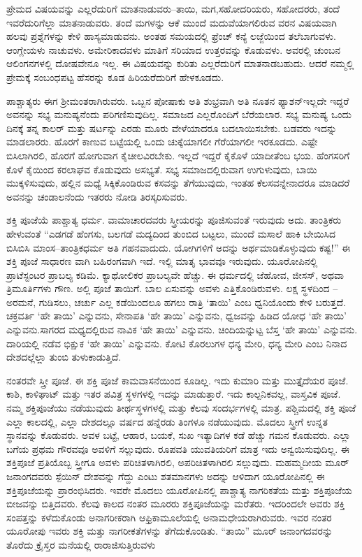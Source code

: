 ಪ್ರೇಮದ ವಿಷಯವನ್ನು ಎಲ್ಲರೆದುರಿಗೆ ಮಾತನಾಡುವರು–ತಾಯಿ, ಮಗ,\break ಸಹೋದರಿಯರು, ಸಹೋದರರು, ತಂದೆ ಇವರೆದುರಿಗೆಲ್ಲಾ ಮಾತನಾಡುವರು. ತಂದೆ ಮಗಳನ್ನು ಆಕೆ ಮುಂದೆ ಮದುವೆಯಾಗಲಿರುವ ವರನ ವಿಷಯವಾಗಿ ಹಲವು ಪ್ರಶ್ನೆಗಳನ್ನು ಕೇಳಿ ಹಾಸ್ಯಮಾಡುವನು. ಅಂತಹ ಸಮಯದಲ್ಲಿ ಫ್ರೆಂಚ್​ ಕನ್ಯೆ ಲಜ್ಜೆಯಿಂದ ತಲೆಬಾಗುವಳು. ಆಂಗ್ಲೇಯಳು ನಾಚುವಳು. ಅಮೇರಿಕಾದವಳು ಮಾತಿಗೆ ಸರಿಯಾದ ಉತ್ತರವನ್ನು ಕೊಡುವಳು. ಅವರಲ್ಲಿ ಚುಂಬನ ಆಲಿಂಗನಗಳಲ್ಲಿ ದೋಷವೇನೂ ಇಲ್ಲ. ಈ ವಿಷಯವನ್ನು ಕುರಿತು ಎಲ್ಲರೆದುರಿಗೆ ಮಾತನಾಡಬಹುದು. ಆದರೆ ನಮ್ಮಲ್ಲಿ ಪ್ರೇಮಕ್ಕೆ ಸಂಬಂಧಪಟ್ಟ ಹೆಸರನ್ನು ಕೂಡ ಹಿರಿಯರೆದುರಿಗೆ ಹೇಳಕೂಡದು.

ಪಾಶ್ಚಾತ್ಯರು ಈಗ ಶ‍್ರೀಮಂತರಾಗಿರುವರು. ಒಬ್ಬನ ಪೋಷಾಕು ಅತಿ ಶುಭ್ರವಾಗಿ ಅತಿ ನೂತನ ಫ್ಯಾಶನ್​ ಇಲ್ಲದೇ ಇದ್ದರೆ ಅವನನ್ನು ಸಭ್ಯ ಮನುಷ್ಯನೆಂದು ಪರಿಗಣಿಸುವುದಿಲ್ಲ. ಸಮಾಜದ ಎಲ್ಲರೊಂದಿಗೆ ಬೆರೆಯಲಾರ. ಸಭ್ಯ ಮನುಷ್ಯ ಒಂದು ದಿನಕ್ಕೆ ತನ್ನ ಕಾಲರ್​ ಮತ್ತು ಷರ್ಟನ್ನು ಎರಡು ಮೂರು ವೇಳೆಯಾದರೂ ಬದಲಾಯಿಸಬೇಕು. ಬಡವರು ಇದನ್ನು ಮಾಡಲಾರರು. ಹೊರಗೆ ಕಾಣುವ ಬಟ್ಟೆಯಲ್ಲಿ ಒಂದು ಚುಕ್ಕೆಯಾಗಲೀ ಗೆರೆ\break ಯಾಗಲೀ ಇರಕೂಡದು. ಎಷ್ಟೇ ಬಿಸಿಲಾಗಿರಲಿ, ಹೊರಗೆ ಹೋಗುವಾಗ ಕೈಚೀಲವಿರಬೇಕು. ಇಲ್ಲದೆ ಇದ್ದರೆ ಕೈಕೊಳೆ ಯಾದೀತೆಂಬ ಭಯ. ಹೆಂಗಸರಿಗೆ ಕೊಳೆ ಕೈಯಿಂದ ಕರಲಾಘವ ಕೊಡುವುದು ಅಸಭ್ಯತೆ. ಸಭ್ಯ ಸಮಾಜದಲ್ಲಿರುವಾಗ ಉಗುಳುವುದು, ಬಾಯಿ ಮುಕ್ಕಳಿಸು\break ವುದು, ಹಲ್ಲಿನ ಮಧ್ಯೆ ಸಿಕ್ಕಿಕೊಂಡಿರುವ ಕಸವನ್ನು ತೆಗೆಯುವುದು, ಇಂತಹ ಕೆಲಸವನ್ನೇ\break ನಾದರೂ ಮಾಡಿದರೆ ಅವನನ್ನು ಚಂಡಾಲನೆಂದು ಇತರರು ನೋಡಿ ತಿರಸ್ಕರಿಸುವರು.

ಶಕ್ತಿ ಪೂಜೆಯೆ ಪಾಶ್ಚಾತ್ಯ ಧರ್ಮ. ವಾಮಾಚಾರದವರು ಸ್ತ್ರೀಯರನ್ನು ಪೂಜಿಸುವಂತೆ ಇರುವುದು ಅದು. ತಾಂತ್ರಿಕರು ಹೇಳುವಂತೆ “ಎಡಗಡೆ ಹೆಂಗಸು, ಬಲಗಡೆ ಮದ್ಯದಿಂದ ತುಂಬಿದ ಬಟ್ಟಲು, ಮುಂದೆ ಮಸಾಲೆ ಹಾಕಿ ಬೇಯಿಸಿದ ಬಿಸಿಬಿಸಿ ಮಾಂಸ–ತಾಂತ್ರಿಕಧರ್ಮ ಅತಿ ಗಹನವಾದುದು. ಯೋಗಿಗಳಿಗೆ ಅದನ್ನು ಅರ್ಥಮಾಡಿಕೊಳ್ಳುವುದು ಕಷ್ಟ!” ಈ ಶಕ್ತಿ ಪೂಜೆ ಸಾಧಾರಣ ವಾಗಿ ಬಹಿರಂಗವಾಗಿ ಇದೆ. ಇಲ್ಲಿ ಮಾತೃ ಭಾವವೂ ಇರುವುದು. ಯೂರೋಪಿನಲ್ಲಿ ಪ್ರಾಟೆಸ್ಟಂಟರ ಪ್ರಾಬಲ್ಯ ಕಡಿಮೆ. ಕ್ಯಾಥೋಲಿಕರ ಪ್ರಾಬಲ್ಯವೇ ಹೆಚ್ಚು. ಈ ಧರ್ಮದಲ್ಲಿ ಜೆಹೋವ, ಜೀಸಸ್​, ಅಥವಾ ತ್ರಿಮೂರ್ತಿಗಳು ಗೌಣ. ಅಲ್ಲಿ ಪೂಜೆ ತಾಯಿಗೆ. ಬಾಲ ಏಸುವನ್ನು ಅವಳು ಎತ್ತಿಕೊಂಡಿರುವಳು. ಲಕ್ಷ ಸ್ಥಳದಿಂದ – ಅರಮನೆ, ಗುಡಿಸಲು, ಚರ್ಚು ಎಲ್ಲ ಕಡೆಯಿಂದಲೂ ಹಗಲು ರಾತ್ರಿ ‘ತಾಯಿ’ ಎಂಬ ಧ್ವನಿಯೊಂದು ಕೇಳಿ ಬರುತ್ತದೆ. ಚಕ್ರವರ್ತಿ ‘ಹೇ ತಾಯಿ’ ಎನ್ನುವನು, ಸೇನಾಪತಿ ‘ಹೇ ತಾಯಿ’ ಎನ್ನುವನು, ಧ್ವಜವನ್ನು ಹಿಡಿದ ಯೋಧ ‘ಹೇ ತಾಯಿ’ ಎನ್ನುವನು.\break ಸಾಗರದ ಮಧ್ಯದಲ್ಲಿರುವ ನಾವಿಕ ‘ಹೇ ತಾಯಿ’ ಎನ್ನುವನು. ಚಿಂದಿಯನ್ನುಟ್ಟ ಬೆಸ್ತ `ಹೇ ತಾಯಿ’ ಎನ್ನುವನು. ದಾರಿಯಲ್ಲಿ ನಡೆವ ಭಿಕ್ಷುಕ `ಹೇ ತಾಯಿ’ ಎನ್ನುವನು. ಕೋಟಿ ಕೊರಲುಗಳ ಧನ್ಯ ಮೇರಿ, ಧನ್ಯ ಮೇರಿ ಎಂಬ ನಿನಾದ ದೇಶದಲ್ಲೆಲ್ಲಾ ತುಂಬಿ ತುಳುಕಾಡುತ್ತಿದೆ.

ನಂತರವೇ ಸ್ತ್ರೀ ಪೂಜೆ. ಈ ಶಕ್ತಿ ಪೂಜೆ ಕಾಮವಾಸನೆಯಿಂದ ಕೂಡಿಲ್ಲ. ಇದು ಕುಮಾರಿ ಮತ್ತು ಮುತ್ತೈದೆಯರ ಪೂಜೆ. ಕಾಶಿ, ಕಾಳಿಘಾಟ್​ ಮತ್ತು ಇತರ ಪವಿತ್ರ ಸ್ಥಳಗಳಲ್ಲಿ ಇದನ್ನು ಮಾಡುತ್ತಾರೆ. ಇದು ಕಾಲ್ಪನಿಕವಲ್ಲ, ವಾಸ್ತವಿಕ ಪೂಜೆ. ನಮ್ಮ ಶಕ್ತಿಪೂಜೆಯು ನಡೆಯುವುದು ತೀರ್ಥಸ್ಥಳಗಳಲ್ಲಿ ಮತ್ತು ಕೆಲವು ಸಂದರ್ಭಗಳಲ್ಲಿ ಮಾತ್ರ. ಪಶ್ಚಿಮದಲ್ಲಿ ಶಕ್ತಿ ಪೂಜೆ ಎಲ್ಲಾ ಕಾಲದಲ್ಲಿ, ಎಲ್ಲಾ ದೇಶದಲ್ಲೂ ವರ್ಷದ ಹನ್ನೆರಡು ತಿಂಗಳೂ ನಡೆಯುವುದು. ಮೊದಲು ಸ್ತ್ರೀಗೆ ಉನ್ನತ ಸ್ಥಾನವನ್ನು ಕೊಡುವರು. ಅವಳ ಬಟ್ಟೆ, ಆಹಾರ, ಬಯಕೆ, ಸುಖ ಇತ್ಯಾದಿಗಳ ಕಡೆ ಹೆಚ್ಚು ಗಮನ ಕೊಡುವರು. ಎಲ್ಲಾ ಬಗೆಯ ಪ್ರಥಮ ಗೌರವವೂ ಅವಳಿಗೆ ಸಲ್ಲುವುದು. ರೂಪವತಿ ಯುವತಿಯರಿಗೆ ಮಾತ್ರ ಇದು ಅನ್ವಯಿಸುವುದಿಲ್ಲ. ಈ ಶಕ್ತಿಪೂಜೆ ಪ್ರತಿಯೊಬ್ಬ ಸ್ತ್ರೀಗೂ ಅವಳು ಪರಿಚಿತಳಾಗಿರಲಿ, ಅಪರಿಚಿತಳಾಗಿರಲಿ ಸಲ್ಲುವುದು. ಮಹಮ್ಮದೀಯ ಮೂರ್​ ಜನಾಂಗದವರು ಸ್ಪೆಯಿನ್​ ದೇಶವನ್ನು ಗೆದ್ದು ಎಂಟು ಶತಮಾನಗಳು ಅದನ್ನು ಆಳಿದಾಗ ಯೂರೋಪಿನಲ್ಲಿ ಈ ಶಕ್ತಿಪೂಜೆಯನ್ನು ಪ್ರಾರಂಭಿಸಿದರು. ಇವರೇ ಮೊದಲು ಯೂರೋಪಿನಲ್ಲಿ ಪಾಶ್ಚಾತ್ಯ ನಾಗರಿಕತೆಯ ಮತ್ತು ಶಕ್ತಿಪೂಜೆಯ ಬೀಜವನ್ನು ಬಿತ್ತಿದವರು. ಕೆಲವು ಕಾಲದ ನಂತರ ಮೂರರು ಶಕ್ತಿಪೂಜೆಯನ್ನು ಮರೆತರು. ಇದರಿಂದಲೇ ಅವರು ಶಕ್ತಿ ಸಂಪತ್ತನ್ನು ಕಳೆದುಕೊಂಡು ಅನಾಗರೀಕರಾಗಿ ಆಫ್ರಿಕಾಮೂಲೆಯಲ್ಲಿ ಅನಾಮಧೇಯರಾಗಿರುವರು. ಇವರ ನಂತರ ಯೂರೋಪು ಇವರು ಶಕ್ತಿ ಮತ್ತು ನಾಗರೀಕತೆಗಳನ್ನು ತೆಗೆದುಕೊಂಡಿತು. “ತಾಯಿ” ಮೂರ್ ಜನಾಂಗದವರನ್ನು ತೊರೆದು ಕ್ರೈಸ್ತರ ಮನೆಯಲ್ಲಿ ರಾರಾಜಿಸುತ್ತಿರುವಳು

